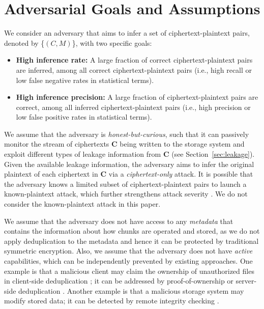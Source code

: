\documentclass[bachelor]{thesis-uestc}
\begin{document}
\section{Adversarial Goals and Assumptions}
\label{sec:assumptions}

We consider an adversary that aims to infer a set of ciphertext-plaintext
pairs, denoted by \{$(C, M)$\}, with two specific goals:
\begin{itemize}[leftmargin=*]
\item
{\bf High inference rate:} A large fraction of correct ciphertext-plaintext pairs
are inferred, among all correct ciphertext-plaintext pairs (i.e., high recall or
low false negative rates in statistical terms).
\item
{\bf High inference precision:} A large fraction of ciphertext-plaintext pairs
are correct, among all inferred ciphertext-plaintext pairs (i.e., high precision
or low false positive rates in statistical terms).
\end{itemize}
  
We assume that the adversary is {\em honest-but-curious}, such that it can
passively monitor the stream of ciphertexts $\mathbf{C}$ being written to the
storage system and exploit different types of leakage information from
$\mathbf{C}$ (see Section~\ref{sec:leakage}).  Given the available leakage
information, the adversary aims to infer the original plaintext of each
ciphertext in $\mathbf{C}$ via a {\em ciphertext-only} attack.  It is possible
that the adversary knows a limited subset of ciphertext-plaintext pairs to
launch a known-plaintext attack, which further strengthens attack severity
\cite{li17}.  We do not consider the known-plaintext attack in this paper. 


We assume that the adversary does not have access to any {\em metadata} that
contains the information about how chunks are operated and stored, as we do
not apply deduplication to the metadata and hence it can be protected by
traditional symmetric encryption.  Also, we assume that the adversary does not
have {\em active} capabilities, which can be independently prevented by
existing approaches. One example is that a malicious client may claim the
ownership of unauthorized files in client-side deduplication
\cite{harnik10,halevi11,mulazzani11}; it can be addressed by
proof-of-ownership \cite{halevi11,xu13,pietro12} or server-side deduplication
\cite{harnik10,li15}.  Another example is that a malicious storage system may
modify stored data; it can be detected by remote integrity checking
\cite{juels07,ateniese07}. 
\end{document}
